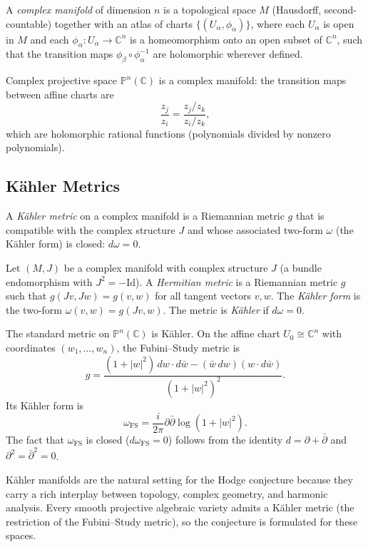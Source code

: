 \begin{definition}
A \emph{complex manifold} of dimension $n$ is a topological space $M$ (Hausdorff, second-countable) together with an atlas of charts $\{(U_\alpha, \phi_\alpha)\}$, where each $U_\alpha$ is open in $M$ and each $\phi_\alpha: U_\alpha \to \mathbb{C}^n$ is a homeomorphism onto an open subset of $\mathbb{C}^n$, such that the transition maps $\phi_\beta \circ \phi_\alpha^{-1}$ are holomorphic wherever defined.
\end{definition}

Complex projective space $\mathbb{P}^n(\mathbb{C})$ is a complex manifold: the transition maps between affine charts are
\[
\frac{z_j}{z_i} = \frac{z_j/z_k}{z_i/z_k},
\]
which are holomorphic rational functions (polynomials divided by nonzero polynomials).

\subsection{K\"{a}hler Metrics}

A \emph{K\"{a}hler metric} on a complex manifold is a Riemannian metric $g$ that is compatible with the complex structure $J$ and whose associated two-form $\omega$ (the K\"{a}hler form) is closed: $d\omega = 0$.

\begin{definition}
Let $(M, J)$ be a complex manifold with complex structure $J$ (a bundle endomorphism with $J^2 = -\mathrm{Id}$). A \emph{Hermitian metric} is a Riemannian metric $g$ such that $g(Jv, Jw) = g(v, w)$ for all tangent vectors $v, w$. The \emph{K\"{a}hler form} is the two-form $\omega(v, w) = g(Jv, w)$. The metric is \emph{K\"{a}hler} if $d\omega = 0$.
\end{definition}

The standard metric on $\mathbb{P}^n(\mathbb{C})$ is K\"{a}hler. On the affine chart $U_0 \cong \mathbb{C}^n$ with coordinates $(w_1, \ldots, w_n)$, the Fubini--Study metric is
\[
g = \frac{(1 + |w|^2)\,dw \cdot d\bar{w} - (\bar{w}\,dw)(w \cdot d\bar{w})}{(1 + |w|^2)^2}.
\]
Its K\"{a}hler form is
\[
\omega_{\text{FS}} = \frac{i}{2\pi} \partial\bar{\partial} \log(1 + |w|^2).
\]
The fact that $\omega_{\text{FS}}$ is closed ($d\omega_{\text{FS}} = 0$) follows from the identity $d = \partial + \bar{\partial}$ and $\partial^2 = \bar{\partial}^2 = 0$.

K\"{a}hler manifolds are the natural setting for the Hodge conjecture because they carry a rich interplay between topology, complex geometry, and harmonic analysis. Every smooth projective algebraic variety admits a K\"{a}hler metric (the restriction of the Fubini--Study metric), so the conjecture is formulated for these spaces.

